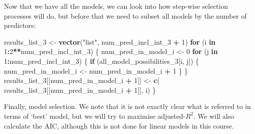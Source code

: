 \documentclass[
]{article}
\newenvironment{Shaded}{\begin{snugshade}}{\end{snugshade}}
\newcommand{\ControlFlowTok}[1]{\textcolor[rgb]{0.13,0.29,0.53}{\textbf{#1}}}
\newcommand{\DecValTok}[1]{\textcolor[rgb]{0.00,0.00,0.81}{#1}}
\newcommand{\KeywordTok}[1]{\textcolor[rgb]{0.13,0.29,0.53}{\textbf{#1}}}
\newcommand{\NormalTok}[1]{#1}
\newcommand{\OperatorTok}[1]{\textcolor[rgb]{0.81,0.36,0.00}{\textbf{#1}}}
\newcommand{\StringTok}[1]{\textcolor[rgb]{0.31,0.60,0.02}{#1}}
\begin{document}

Now that we have all the models, we can look into how step-wise
selection processes will do, but before that we need to subset all
models by the number of predictors:

\begin{Shaded}
\begin{Highlighting}[]
\NormalTok{results_list_}\DecValTok{3}\NormalTok{ <-}\StringTok{ }\KeywordTok{vector}\NormalTok{(}\StringTok{"list"}\NormalTok{, num_pred_incl_int_}\DecValTok{3} \OperatorTok{+}\StringTok{ }\DecValTok{1}\NormalTok{)}
\ControlFlowTok{for}\NormalTok{ (i }\ControlFlowTok{in} \DecValTok{1}\OperatorTok{:}\DecValTok{2}\OperatorTok{**}\NormalTok{num_pred_incl_int_}\DecValTok{3}\NormalTok{) \{}
\NormalTok{  num_pred_in_model_i <-}\StringTok{ }\DecValTok{0}
  \ControlFlowTok{for}\NormalTok{ (j }\ControlFlowTok{in} \DecValTok{1}\OperatorTok{:}\NormalTok{num_pred_incl_int_}\DecValTok{3}\NormalTok{) \{}
    \ControlFlowTok{if}\NormalTok{ (all_model_possibilities_}\DecValTok{3}\NormalTok{[i, j]) \{}
\NormalTok{      num_pred_in_model_i <-}\StringTok{ }\NormalTok{num_pred_in_model_i }\OperatorTok{+}\StringTok{ }\DecValTok{1}
\NormalTok{    \}}
\NormalTok{  \}}
\NormalTok{  results_list_}\DecValTok{3}\NormalTok{[[num_pred_in_model_i }\OperatorTok{+}\StringTok{ }\DecValTok{1}\NormalTok{]] <-}\StringTok{ }\KeywordTok{c}\NormalTok{(}
\NormalTok{    results_list_}\DecValTok{3}\NormalTok{[[num_pred_in_model_i }\OperatorTok{+}\StringTok{ }\DecValTok{1}\NormalTok{]], i)}
\NormalTok{\}}
\end{Highlighting}
\end{Shaded}

Finally, model selection. We note that it is not exactly clear what is
referred to in terms of `best' model, but we will try to maximise
adjusted-\(R^{2}\). We will also calculate the AIC, although this is not
done for linear models in this course.
\end{document}
